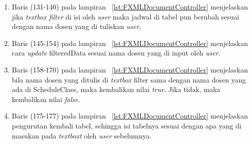\begin{enumerate}
\begin{enumerate}
	\item Baris (131-140) pada lampiran ~\ref{lst:FXMLDocumentController} menjelaskan jika \textit{textbox filter} di isi oleh \textit{user} maka jadwal di tabel pun berubah sesuai dengan nama dosen yang di tuliskan \textit{user}.
	\item Baris (145-154) pada lampiran ~\ref{lst:FXMLDocumentController} menjelaskan cara \textit{update} filteredData sesuai nama dosen yang di input oleh \textit{user}.
	\item Baris (158-170) pada lampiran ~\ref{lst:FXMLDocumentController} menjelaskan bila nama dosen yang ditulis di \textit{textbox} filter sama dengan nama dosen yang ada di ScheduleClass, maka kembalikan nilai \textit{true}. Jika tidak, maka kembalikan nilai \textit{false}.
	\item Baris (175-177) pada lampiran ~\ref{lst:FXMLDocumentController} menjelaskan pengurutan kembali tabel, sehingga isi tabelnya sesuai dengan apa yang di masukan pada \textit{textboxt} oleh \textit{user} sebelumnya.
\end{enumerate}
	
\end{enumerate}

